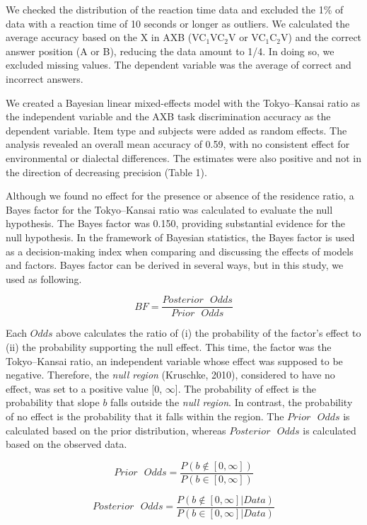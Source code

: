 \documentclass[a4paper,11pt,twocolumn]{article}
\begin{document}
We checked the distribution of the reaction time data and excluded the 1\% of data with a reaction time of 10 seconds or longer as outliers. We calculated the average accuracy based on the X in AXB (VC$_\text{1}$VC$_\text{2}$V or VC$_\text{1}$C$_\text{2}$V) and the correct answer position (A or B), reducing the data amount to 1/4. In doing so, we excluded missing values. The dependent variable was the average of correct and incorrect answers.

We created a Bayesian linear mixed-effects model \cite{lme4, rstanarm, easystats} with the Tokyo--Kansai ratio as the independent variable and the AXB task discrimination accuracy as the dependent variable. Item type and subjects were added as random effects. The analysis revealed an overall mean accuracy of 0.59, with no consistent effect for environmental or dialectal differences. The estimates were also positive and not in the direction of decreasing precision (Table 1).

Although we found no effect for the presence or absence of the residence ratio, a Bayes factor for the Tokyo--Kansai ratio was calculated to evaluate the null hypothesis. The Bayes factor was 0.150, providing substantial evidence for the null hypothesis. In the framework of Bayesian statistics, the Bayes factor is used as a decision-making index when comparing and discussing the effects of models and factors. Bayes factor can be derived in several ways, but in this study, we used as following.

$$
BF = \frac{Posterior \text{ }Odds }{Prior \text{ }Odds}
$$

Each $Odds$ above calculates the ratio of (i) the probability of the factor's effect to (ii) the probability supporting the null effect. This time, the factor was the Tokyo--Kansai ratio, an independent variable whose effect was supposed to be negative. Therefore, the \textit{null region} (Kruschke, 2010), considered to have no effect, was set to a positive value [0, $\infty$]. The probability of effect is the probability that slope $b$ falls outside the \textit{null region}. In contrast, the probability of no effect is the probability that it falls within the region. The $Prior \text{ }Odds$ is calculated based on the prior distribution, whereas $Posterior \text{ }Odds$ is calculated based on the observed data.

$$ Prior\text{ }Odds = \frac{P(b\notin[0, \infty])}{P(b\in[0, \infty])} $$

$$ Posterior \text{ }Odds = \frac{P(b\notin[0, \infty] | Data)}{P(b\in[0, \infty] | Data)} $$
\end{document}
